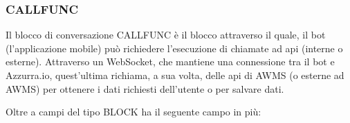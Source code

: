 

\subsubsection{CALLFUNC}

Il blocco di conversazione CALLFUNC è il blocco attraverso il quale, il \gls{bot}\ap{[g]} (l'applicazione mobile) può richiedere l’esecuzione di chiamate ad \gls{api}\ap{[g]} (interne o esterne). Attraverso un \gls{WebSocket}\ap{[g]}, che mantiene una connessione tra il \gls{bot}\ap{[g]} e Azzurra.io, quest’ultima richiama, a sua volta, delle \gls{api}\ap{[g]} di \gls{AWMS}\ap{[g]} (o esterne ad \gls{AWMS}\ap{[g]}) per ottenere i dati richiesti dell’utente o per salvare dati. 


Oltre a campi del tipo BLOCK ha il seguente campo in più:

